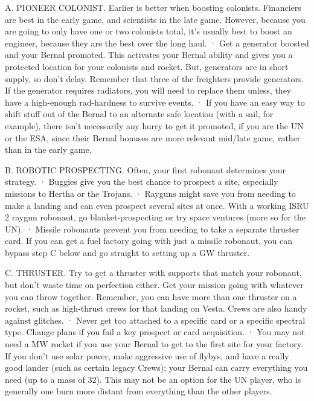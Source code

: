 \documentclass[a4paper]{book}
\begin{document}
A. PIONEER COLONIST. Earlier is better when boosting colonists. Financiers are best in the early game, and scientists in the late game. However, because you are going to only have one or two colonists total, it’s usually best to boost an engineer, because they are the best over the long haul.
·       Get a generator boosted and your Bernal promoted. This activates your Bernal ability and gives you a protected location for your colonists and rocket. But, generators are in short supply, so don’t delay. Remember that three of the freighters provide generators. If the generator requires radiators, you will need to replace them unless, they have a high-enough rad-hardness to survive events.
·       If you have an easy way to shift stuff out of the Bernal to an alternate safe location (with a sail, for example), there isn't necessarily any hurry to get it promoted, if you are the UN or the ESA, since their Bernal bonuses are more relevant mid/late game, rather than in the early game.

B. ROBOTIC PROSPECTING. Often, your first robonaut determines your strategy.
·       Buggies give you the best chance to prospect a site, especially missions to Hertha or the Trojans.
·       Rayguns might save you from needing to make a landing and can even prospect several sites at once. With a working ISRU 2 raygun robonaut, go blanket-prospecting or try space ventures (more so for the UN).
·       Missile robonauts prevent you from needing to take a separate thruster card. If you can get a fuel factory going with just a missile robonaut, you can bypass step C below and go straight to setting up a GW thruster.

C. THRUSTER. Try to get a thruster with supports that match your robonaut, but don’t waste time on perfection either. Get your mission going with whatever you can throw together. Remember, you can have more than one thruster on a rocket, such as high-thrust crews for that landing on Vesta. Crews are also handy against glitches.
·       Never get too attached to a specific card or a specific spectral type. Change plans if you fail a key prospect or card acquisition.
·       You may not need a MW rocket if you use your Bernal to get to the first site for your factory. If you don’t use solar power, make aggressive use of flybys, and have a really good lander (such as certain legacy Crews); your Bernal can carry everything you need (up to a mass of 32). This may not be an option for the UN player, who is generally one burn more distant from everything than the other players.
\end{document}
